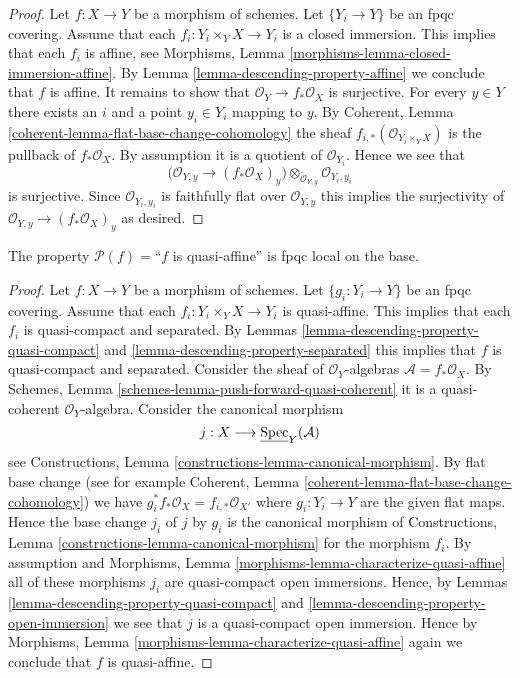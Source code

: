 \begin{proof}
Let $f : X \to Y$ be a morphism of schemes.
Let $\{Y_i \to Y\}$ be an fpqc covering.
Assume that each $f_i : Y_i \times_Y X \to Y_i$
is a closed immersion.
This implies that each $f_i$ is affine, see
Morphisms, Lemma \ref{morphisms-lemma-closed-immersion-affine}.
By Lemma \ref{lemma-descending-property-affine}
we conclude that $f$ is affine. It remains to show that
$\mathcal{O}_Y \to f_*\mathcal{O}_X$ is surjective.
For every $y \in Y$ there exists an $i$ and a point
$y_i \in Y_i$ mapping to $y$.
By Coherent, Lemma \ref{coherent-lemma-flat-base-change-cohomology}
the sheaf $f_{i, *}(\mathcal{O}_{Y_i \times_Y X})$
is the pullback of $f_*\mathcal{O}_X$.
By assumption it is a quotient of $\mathcal{O}_{Y_i}$.
Hence we see that
$$
\Big(
\mathcal{O}_{Y, y} \longrightarrow (f_*\mathcal{O}_X)_y
\Big)
\otimes_{\mathcal{O}_{Y, y}} \mathcal{O}_{Y_i, y_i}
$$
is surjective. Since $\mathcal{O}_{Y_i, y_i}$ is faithfully
flat over $\mathcal{O}_{Y, y}$ this implies the surjectivity
of $\mathcal{O}_{Y, y} \longrightarrow (f_*\mathcal{O}_X)_y$ as
desired.
\end{proof}

\begin{lemma}
\label{lemma-descending-property-quasi-affine}
The property $\mathcal{P}(f) =$``$f$ is quasi-affine''
is fpqc local on the base.
\end{lemma}

\begin{proof}
Let $f : X \to Y$ be a morphism of schemes.
Let $\{g_i : Y_i \to Y\}$ be an fpqc covering.
Assume that each $f_i : Y_i \times_Y X \to Y_i$
is quasi-affine.
This implies that each $f_i$ is quasi-compact and separated.
By Lemmas \ref{lemma-descending-property-quasi-compact}
and \ref{lemma-descending-property-separated}
this implies that $f$ is quasi-compact and separated.
Consider the sheaf of $\mathcal{O}_Y$-algebras
$\mathcal{A} = f_*\mathcal{O}_X$.
By Schemes, Lemma \ref{schemes-lemma-push-forward-quasi-coherent}
it is a quasi-coherent $\mathcal{O}_Y$-algebra.
Consider the canonical morphism
$$
j : X \longrightarrow \underline{\mathop{\rm Spec}}_Y(\mathcal{A})
$$
see Constructions, Lemma \ref{constructions-lemma-canonical-morphism}.
By flat base change
(see for example
Coherent, Lemma \ref{coherent-lemma-flat-base-change-cohomology})
we have $g_i^*f_*\mathcal{O}_X = f_{i,*}\mathcal{O}_{X'}$
where $g_i : Y_i \to Y$ are the given flat
maps. Hence the base change $j_i$ of $j$ by $g_i$ is the canonical
morphism of Constructions, Lemma \ref{constructions-lemma-canonical-morphism}
for the morphism $f_i$. By assumption and
Morphisms, Lemma \ref{morphisms-lemma-characterize-quasi-affine}
all of these
morphisms $j_i$ are quasi-compact open immersions. Hence, by
Lemmas \ref{lemma-descending-property-quasi-compact} and
\ref{lemma-descending-property-open-immersion} we
see that $j$ is a quasi-compact open immersion.
Hence by 
Morphisms, Lemma \ref{morphisms-lemma-characterize-quasi-affine}
again we conclude that $f$ is quasi-affine.
\end{proof}

